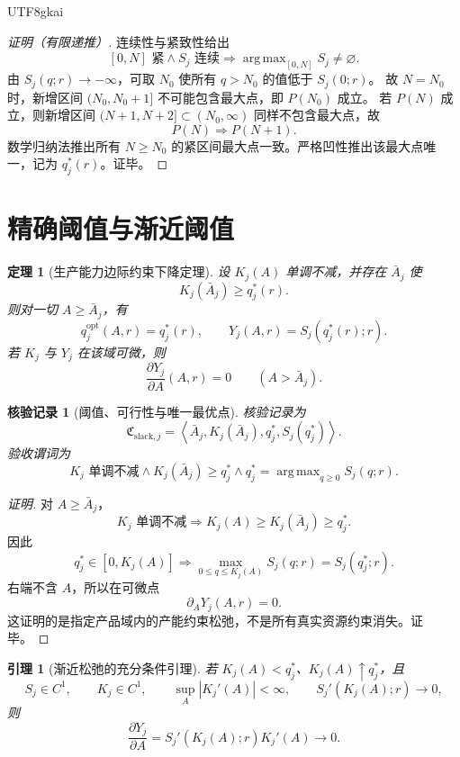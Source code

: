 \documentclass[12pt,a4paper,openany]{report}
\newtheorem{theorem}{定理}[chapter]
\newtheorem{lemma}{引理}[chapter]
\newtheorem{Certificate}{核验记录}[chapter]
\newcommand{\Abs}[1]{\left\lvert #1\right\rvert}
\newcommand{\Tuple}[1]{\left\langle #1\right\rangle}
\DeclareMathOperator*{\argmax}{arg\,max}
\begin{document}
\begin{CJK*}{UTF8}{gkai}
\begin{proof}[证明（有限递推）]
连续性与紧致性给出
\[
  [0,N]\text{ 紧}\wedge S_j\text{ 连续}
  \Longrightarrow
  \argmax_{[0,N]}S_j\ne\varnothing.
\]
由 \(S_j(q;r)\to-\infty\)，可取 \(N_0\) 使所有 \(q>N_0\) 的值低于 \(S_j(0;r)\)。
故 \(N=N_0\) 时，新增区间 \((N_0,N_0+1]\) 不可能包含最大点，即 \(P(N_0)\) 成立。
若 \(P(N)\) 成立，则新增区间 \((N+1,N+2]\subset(N_0,\infty)\) 同样不包含最大点，故
\[
  P(N)\Longrightarrow P(N+1).
\]
数学归纳法推出所有 \(N\ge N_0\) 的紧区间最大点一致。严格凹性推出该最大点唯一，记为
\(q_j^*(r)\)。证毕。
\end{proof}

\section{精确阈值与渐近阈值}

\begin{theorem}[生产能力边际约束下降定理]
\label{thm:capacity-marginal-relaxation}
设 \(K_j(A)\) 单调不减，并存在 \(\bar A_j\) 使
\[
  K_j(\bar A_j)\ge q_j^*(r).
\]
则对一切 \(A\ge\bar A_j\)，有
\[
  q_j^{\mathrm{opt}}(A,r)=q_j^*(r),\qquad
  Y_j(A,r)=S_j(q_j^*(r);r).
\]
若 \(K_j\) 与 \(Y_j\) 在该域可微，则
\[
  \frac{\partial Y_j}{\partial A}(A,r)=0
  \qquad(A>\bar A_j).
\]
\end{theorem}

\begin{Certificate}[阈值、可行性与唯一最优点]
核验记录为
\[
  \mathfrak C_{\mathrm{slack},j}
  =\Tuple{\bar A_j,K_j(\bar A_j),q_j^*,S_j(q_j^*)}.
\]
验收谓词为
\[
  K_j\text{ 单调不减}
  \wedge K_j(\bar A_j)\ge q_j^*
  \wedge q_j^*=\argmax_{q\ge0}S_j(q;r).
\]
\end{Certificate}

\begin{proof}[证明]
对 \(A\ge\bar A_j\)，
\[
  K_j\text{ 单调不减}
  \Longrightarrow
  K_j(A)\ge K_j(\bar A_j)\ge q_j^*.
\]
因此
\[
  q_j^*\in[0,K_j(A)]
  \Longrightarrow
  \max_{0\le q\le K_j(A)}S_j(q;r)
  =S_j(q_j^*;r).
\]
右端不含 \(A\)，所以在可微点
\[
  \partial_A Y_j(A,r)=0.
\]
这证明的是指定产品域内的产能约束松弛，不是所有真实资源约束消失。证毕。
\end{proof}

\begin{lemma}[渐近松弛的充分条件引理]
\label{lem:asymptotic-capacity-relaxation}
若 \(K_j(A)<q_j^*\)、\(K_j(A)\uparrow q_j^*\)，且
\[
  S_j\in C^1,\qquad K_j\in C^1,\qquad
  \sup_A\Abs{K_j'(A)}<\infty,\qquad
  S_j'(K_j(A);r)\to0,
\]
则
\[
  \frac{\partial Y_j}{\partial A}
  =S_j'(K_j(A);r)K_j'(A)\to0.
\]
\end{lemma}


\end{CJK*}
\end{document}
